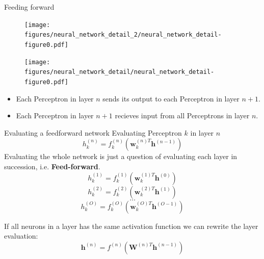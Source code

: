 \documentclass[]{beamer}
\begin{document}
\begin{frame}
   {Feeding forward}
   \begin{minipage}{0.475\linewidth}
   \begin{figure}
      \texttt{[image: figures/neural\_network\_detail\_2/neural\_network\_detail-figure0.pdf]}
   \end{figure}
   \end{minipage}
   \begin{minipage}{0.475\linewidth}
   \begin{figure}
      \texttt{[image: figures/neural\_network\_detail/neural\_network\_detail-figure0.pdf]}
   \end{figure}
   \end{minipage}
   \scriptsize
   \vspace{0.4cm}
   \begin{center}
   \begin{itemize}
      \item
         Each Perceptron in layer $n$ sends its output to each Perceptron in layer $n + 1$.
      \item
         Each Perceptron in layer $n + 1$ recieves input from all Perceptrons in layer $n$.
   \end{itemize}
   \end{center}
\end{frame}

\begin{frame}
   {Evaluating a feedforward network}
   \scriptsize
   Evaluating Perceptron $k$ in layer $n$
   \begin{equation*}
      h^{(n)}_k = f^{(n)}_k \left( \boldsymbol{w}^{(n)T}_k \boldsymbol{h}^{(n-1)} \right) 
   \end{equation*}
   Evaluating the whole network is just a question of evaluating each layer in succession, i.e. \textbf{Feed-forward}.
   \begin{equation*}
      h^{(1)}_k = f^{(1)}_k \left( \boldsymbol{w}^{(1)T}_k \boldsymbol{h}^{(0)} \right) 
   \end{equation*}
   \begin{equation*}
      h^{(2)}_k = f^{(2)}_k \left( \boldsymbol{w}^{(2)T}_k \boldsymbol{h}^{(1)} \right) 
   \end{equation*}
   \begin{equation*}
      \dots
   \end{equation*}
   \begin{equation*}
      h^{(O)}_k = f^{(O)}_k \left( \boldsymbol{w}^{(O)T}_k \boldsymbol{h}^{(O-1)} \right) 
   \end{equation*}
   
   \vspace{0.4cm}
   If all neurons in a layer has the same activation function we can rewrite the layer evaluation:
   \begin{equation*}
      \boldsymbol{h}^{(n)} = f^{(n)} \left( \boldsymbol{W}^{(n)T} \boldsymbol{h}^{(n-1)} \right)
   \end{equation*}
\end{frame}
\end{document}
